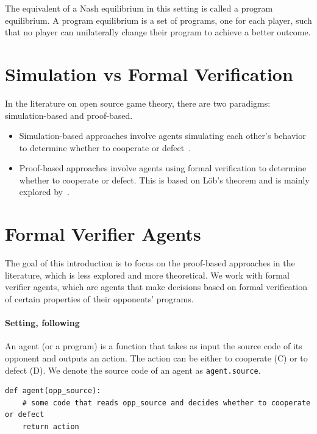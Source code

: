\documentclass{article}
\begin{document}
The equivalent of a Nash equilibrium in this setting is called a program equilibrium. A program equilibrium is a set of programs, one for each player, such that no player can unilaterally change their program to achieve a better outcome.

\section{Simulation vs Formal Verification}
In the literature on open source game theory, there are two paradigms: simulation-based and proof-based.
\begin{itemize}
    \item Simulation-based approaches involve agents simulating each other's behavior to determine whether to cooperate or defect~\parencite{robust_program_equilibrium,caspar_oesterheld_program_equilibrium,cooper2025characterisingsimulationbasedprogramequilibria}.
    \item Proof-based approaches involve agents using formal verification to determine whether to cooperate or defect. This is based on Löb's theorem and is mainly explored by~\textcite{critch2022cooperativeuncooperativeinstitutiondesigns}.
\end{itemize}

\section{Formal Verifier Agents}
The goal of this introduction is to focus on the proof-based approaches in the literature, which is less explored and more theoretical. We work with formal verifier agents, which are agents that make decisions based on formal verification of certain properties of their opponents' programs.

\paragraph{Setting, following \textcite{critch2022cooperativeuncooperativeinstitutiondesigns}}

An agent (or a program) is a function that takes as input the source code of its opponent and outputs an action. The action can be either to cooperate (C) or to defect (D). We denote the source code of an agent as \texttt{agent.source}.
\begin{verbatim}
def agent(opp_source):
    # some code that reads opp_source and decides whether to cooperate or defect
    return action
\end{verbatim}
\end{document}
